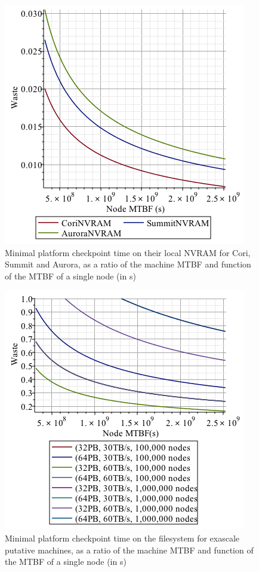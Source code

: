 \documentclass{article}
\begin{document}
\begin{figure}[h!]
\begin{center}
  \includegraphics[width=.6\linewidth]{csa-nvram.png}
\end{center}
\caption{Minimal platform checkpoint time on their local NVRAM for Cori, Summit and Aurora, as a ratio of the machine MTBF and function of the MTBF of a single node (in s)\label{fig:csa-nvram}}
\end{figure}

\begin{figure}[h!]
\begin{center}
  \includegraphics[width=.6\linewidth]{exa.png}
\end{center}
\caption{Minimal platform checkpoint time on the filesystem for exascale putative machines, as a ratio of the machine MTBF and function of the MTBF of a single node (in s)\label{fig:exa}}
\end{figure}
\end{document}
